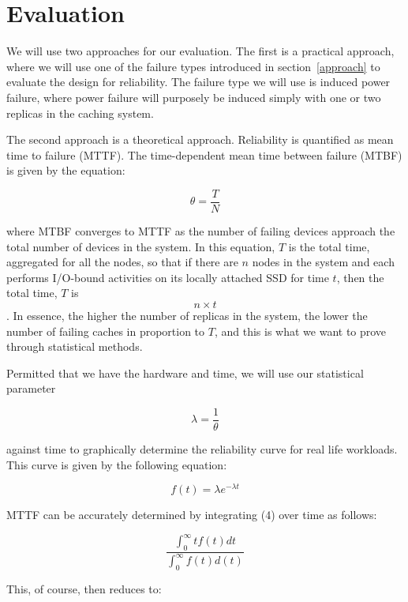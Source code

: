 \section{Evaluation}

We will use two approaches for our evaluation. The first
is a practical approach, where we will use one of the
failure types introduced in section~\ref{approach} to evaluate
the design for reliability. The failure type we will use is
induced power failure, where power failure will purposely be
induced simply with one or two replicas in the caching system.

The second approach is a theoretical approach. Reliability is
quantified as mean time to failure (MTTF). The time-dependent
mean time between failure (MTBF) is given by the equation:

\begin{equation}
\theta = \frac{T}{N}
\end{equation}

where MTBF converges to MTTF as the number of failing devices
approach the total number of devices in the system.
In this equation,
$T$ is the total time, aggregated for all the nodes, so that if
there are $n$ nodes in the system and each performs I/O-bound
activities on its locally attached SSD for time $t$, then the
total time, $T$ is \[n\times{t}\]. In essence, the
higher the number of replicas in the system, the lower the
number of failing caches in proportion to $T$, and this is what
we want to prove through statistical methods.

Permitted that we have the hardware and time, we will use our
statistical parameter

\begin{equation}
	\lambda = \frac{1}{\theta}
\end{equation}

against time
to graphically determine the reliability curve for real life
workloads. This curve is given by the following equation:

\begin{equation}
	f(t) = \lambda e^{-\lambda t}
\end{equation}

MTTF can be accurately determined by integrating (4) over time
as follows:

\begin{equation}
	\frac{\int_0^\infty tf(t)dt}{\int_0^\infty f(t)d(t)}
\end{equation}

This, of course, then reduces to:

